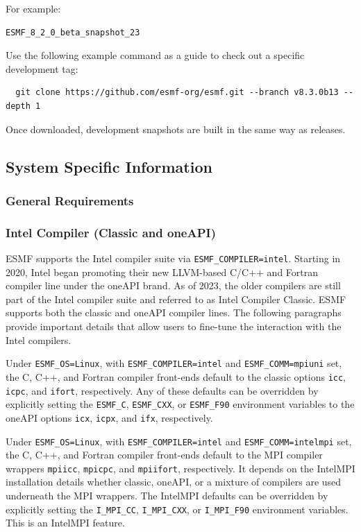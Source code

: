 For example:
\begin{verbatim}
ESMF_8_2_0_beta_snapshot_23
\end{verbatim}

Use the following example command as a guide to check out a specific development tag:

\begin{verbatim}
  git clone https://github.com/esmf-org/esmf.git --branch v8.3.0b13 --depth 1
\end{verbatim}

Once downloaded, development snapshots are built in the same way as releases.

\subsection{System Specific Information}

\subsubsection{General Requirements}
\label{sec:systemreq}


\subsubsection{Intel Compiler (Classic and oneAPI)}

ESMF supports the Intel compiler suite via {\tt ESMF\_COMPILER=intel}. Starting in 2020, Intel began promoting their
new LLVM-based C/C++ and Fortran compiler line under the oneAPI brand. As of 2023, the older compilers are still
part of the Intel compiler suite and referred to as Intel Compiler Classic. ESMF supports both the classic and oneAPI
compiler lines. The following paragraphs provide important details that allow users to fine-tune the interaction
with the Intel compilers.

Under {\tt ESMF\_OS=Linux}, with {\tt ESMF\_COMPILER=intel} and {\tt ESMF\_COMM=mpiuni} set, the C, C++, and
Fortran compiler front-ends default to the classic options {\tt icc}, {\tt icpc}, and {\tt ifort}, respectively. Any
of these defaults can be overridden by explicitly setting the {\tt ESMF\_C}, {\tt ESMF\_CXX}, or {\tt ESMF\_F90}
environment variables to the oneAPI options {\tt icx}, {\tt icpx}, and {\tt ifx}, respectively.

Under {\tt ESMF\_OS=Linux}, with {\tt ESMF\_COMPILER=intel} and {\tt ESMF\_COMM=intelmpi} set, the C, C++, and
Fortran compiler front-ends default to the MPI compiler wrappers {\tt mpiicc}, {\tt mpicpc}, and {\tt mpiifort},
respectively. It depends on the IntelMPI installation details whether classic, oneAPI, or a mixture of compilers
are used underneath the MPI wrappers. The IntelMPI defaults can be overridden by explicitly setting the
{\tt I\_MPI\_CC}, {\tt I\_MPI\_CXX}, or {\tt I\_MPI\_F90} environment variables. This is an IntelMPI feature.

